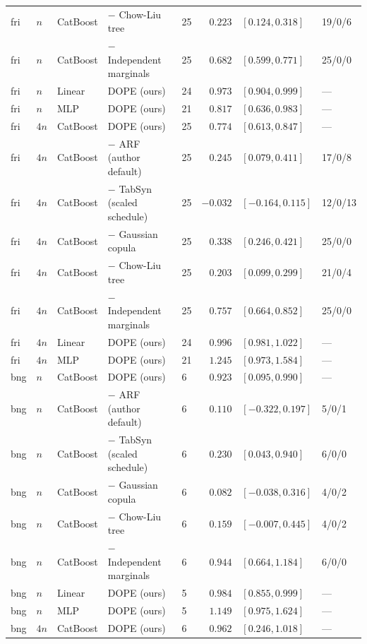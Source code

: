 \begin{longtable}{lllllrll}
fri & $n$ & CatBoost & $-$ Chow-Liu tree & 25 & $0.223$ & $[0.124, 0.318]$ & 19/0/6 \\
fri & $n$ & CatBoost & $-$ Independent marginals & 25 & $0.682$ & $[0.599, 0.771]$ & 25/0/0 \\
fri & $n$ & Linear & DOPE (ours) & 24 & $0.973$ & $[0.904, 0.999]$ & --- \\
fri & $n$ & MLP & DOPE (ours) & 21 & $0.817$ & $[0.636, 0.983]$ & --- \\
fri & $4n$ & CatBoost & DOPE (ours) & 25 & $0.774$ & $[0.613, 0.847]$ & --- \\
fri & $4n$ & CatBoost & $-$ ARF (author default) & 25 & $0.245$ & $[0.079, 0.411]$ & 17/0/8 \\
fri & $4n$ & CatBoost & $-$ TabSyn (scaled schedule) & 25 & $-0.032$ & $[-0.164, 0.115]$ & 12/0/13 \\
fri & $4n$ & CatBoost & $-$ Gaussian copula & 25 & $0.338$ & $[0.246, 0.421]$ & 25/0/0 \\
fri & $4n$ & CatBoost & $-$ Chow-Liu tree & 25 & $0.203$ & $[0.099, 0.299]$ & 21/0/4 \\
fri & $4n$ & CatBoost & $-$ Independent marginals & 25 & $0.757$ & $[0.664, 0.852]$ & 25/0/0 \\
fri & $4n$ & Linear & DOPE (ours) & 24 & $0.996$ & $[0.981, 1.022]$ & --- \\
fri & $4n$ & MLP & DOPE (ours) & 21 & $1.245$ & $[0.973, 1.584]$ & --- \\
bng & $n$ & CatBoost & DOPE (ours) & 6 & $0.923$ & $[0.095, 0.990]$ & --- \\
bng & $n$ & CatBoost & $-$ ARF (author default) & 6 & $0.110$ & $[-0.322, 0.197]$ & 5/0/1 \\
bng & $n$ & CatBoost & $-$ TabSyn (scaled schedule) & 6 & $0.230$ & $[0.043, 0.940]$ & 6/0/0 \\
bng & $n$ & CatBoost & $-$ Gaussian copula & 6 & $0.082$ & $[-0.038, 0.316]$ & 4/0/2 \\
bng & $n$ & CatBoost & $-$ Chow-Liu tree & 6 & $0.159$ & $[-0.007, 0.445]$ & 4/0/2 \\
bng & $n$ & CatBoost & $-$ Independent marginals & 6 & $0.944$ & $[0.664, 1.184]$ & 6/0/0 \\
bng & $n$ & Linear & DOPE (ours) & 5 & $0.984$ & $[0.855, 0.999]$ & --- \\
bng & $n$ & MLP & DOPE (ours) & 5 & $1.149$ & $[0.975, 1.624]$ & --- \\
bng & $4n$ & CatBoost & DOPE (ours) & 6 & $0.962$ & $[0.246, 1.018]$ & --- \\

\end{longtable}
